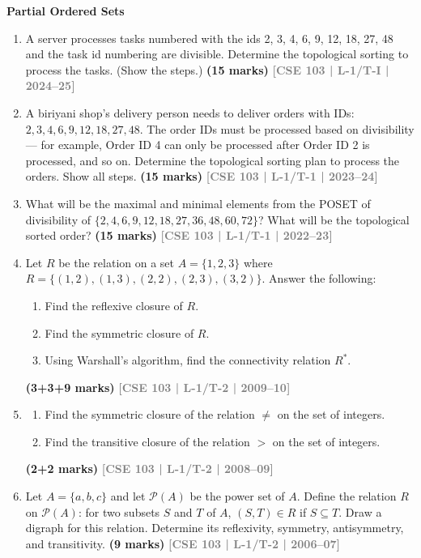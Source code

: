\documentclass[12pt,a3paper]{article}
\newcommand{\yr}[1]{\hfill\textcolor{gray}{\small\textbf{[#1]}}}
\newcommand{\mk}[1]{\textcolor{orange!70!black}{\small\textbf{(#1 marks)}}}
\newcommand{\subtopic}[2]{%
  \vspace{10pt}
  \noindent\begin{tcolorbox}[colback=#1!8,colframe=#1,boxrule=0.6pt,arc=4pt,
    left=6pt,right=6pt,top=4pt,bottom=4pt]
    \small\bfseries\textcolor{#1}{#2}
  \end{tcolorbox}
  \vspace{2pt}
}
\begin{document}
\subtopic{cB}{Partial Ordered Sets}
\label{sub:s4-poset}

\begin{enumerate}


\item A server processes tasks numbered with the ids 2, 3, 4, 6, 9, 12, 18, 27, 48 and the task id numbering are divisible. Determine the topological sorting to process the tasks. (Show the steps.)
\mk{15} \yr{CSE 103 | L-1/T-I | 2024--25}

\item A biriyani shop's delivery person needs to deliver orders with IDs: $2, 3, 4, 6, 9, 12, 18, 27, 48$. The order IDs must be processed based on divisibility — for example, Order ID 4 can only be processed after Order ID 2 is processed, and so on. Determine the topological sorting plan to process the orders. Show all steps.
\mk{15} \yr{CSE 103 | L-1/T-1 | 2023--24}

\item What will be the maximal and minimal elements from the POSET of divisibility of $\{2, 4, 6, 9, 12, 18, 27, 36, 48, 60, 72\}$? What will be the topological sorted order?
\mk{15} \yr{CSE 103 | L-1/T-1 | 2022--23}

\item Let $R$ be the relation on a set $A = \{1, 2, 3\}$ where $R = \{(1,2),(1,3),(2,2),(2,3),(3,2)\}$. Answer the following:
\begin{enumerate}
  \item Find the reflexive closure of $R$.
  \item Find the symmetric closure of $R$.
  \item Using Warshall's algorithm, find the connectivity relation $R^*$.
\end{enumerate}
\mk{3+3+9} \yr{CSE 103 | L-1/T-2 | 2009--10}

\item \begin{enumerate}
  \item Find the symmetric closure of the relation $\neq$ on the set of integers.
  \item Find the transitive closure of the relation $>$ on the set of integers.
\end{enumerate}
\mk{2+2} \yr{CSE 103 | L-1/T-2 | 2008--09}

\item Let $A = \{a, b, c\}$ and let $\mathcal{P}(A)$ be the power set of $A$. Define the relation $R$ on $\mathcal{P}(A)$: for two subsets $S$ and $T$ of $A$, $(S, T) \in R$ if $S \subseteq T$. Draw a digraph for this relation. Determine its reflexivity, symmetry, antisymmetry, and transitivity.
\mk{9} \yr{CSE 103 | L-1/T-2 | 2006--07}

\end{enumerate}
\end{document}
